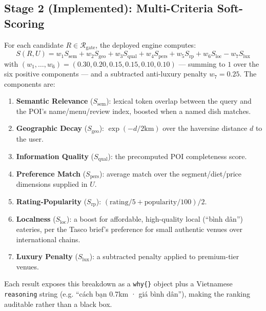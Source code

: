 \documentclass[acmsmall,screen]{acmart}
\begin{document}
\subsection{Stage 2 (Implemented): Multi-Criteria Soft-Scoring}
\label{sec:softscore}
For each candidate $R \in \mathcal{R}_{\text{gate}}$, the deployed engine computes:
\begin{equation}
S(R,U) = w_1 S_{\text{sem}} + w_2 S_{\text{geo}} + w_3 S_{\text{qual}} + w_4 S_{\text{pers}} + w_5 S_{\text{rp}} + w_6 S_{\text{loc}} - w_7 S_{\text{lux}}
\end{equation}
with $(w_1,\ldots,w_6) = (0.30, 0.20, 0.15, 0.15, 0.10, 0.10)$ — summing to $1$ over the six positive components — and a subtracted anti-luxury penalty $w_7 = 0.25$. The components are:
\begin{enumerate}
    \item \textbf{Semantic Relevance} ($S_{\text{sem}}$): lexical token overlap between the query and the POI's name/menu/review index, boosted when a named dish matches.
    \item \textbf{Geographic Decay} ($S_{\text{geo}}$): $\exp(-d/2\text{km})$ over the haversine distance $d$ to the user.
    \item \textbf{Information Quality} ($S_{\text{qual}}$): the precomputed POI completeness score.
    \item \textbf{Preference Match} ($S_{\text{pers}}$): average match over the segment/diet/price dimensions supplied in $U$.
    \item \textbf{Rating-Popularity} ($S_{\text{rp}}$): $(\text{rating}/5 + \text{popularity}/100)/2$.
    \item \textbf{Localness} ($S_{\text{loc}}$): a boost for affordable, high-quality local (``bình dân'') eateries, per the Tasco brief's preference for small authentic venues over international chains.
    \item \textbf{Luxury Penalty} ($S_{\text{lux}}$): a subtracted penalty applied to premium-tier venues.
\end{enumerate}
Each result exposes this breakdown as a \texttt{why\{\}} object plus a Vietnamese \texttt{reasoning} string (e.g. ``cách bạn 0.7km · giá bình dân''), making the ranking auditable rather than a black box.
\end{document}
